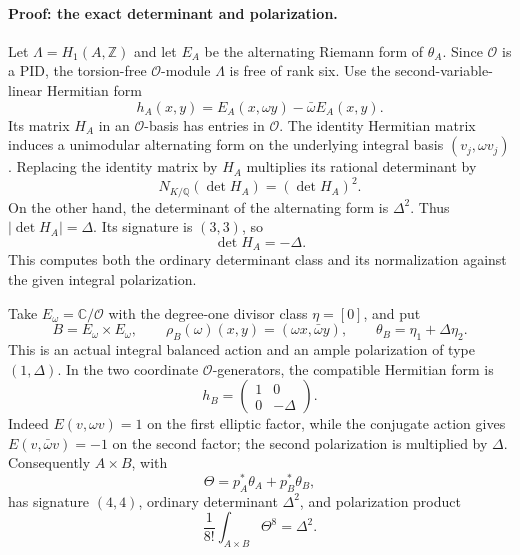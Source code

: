 \paragraph{Proof: the exact determinant and polarization.}
Let $\Lambda=H_1(A,\mathbb Z)$ and let $E_A$ be the alternating
Riemann form of $\theta_A$. Since $\mathcal O$ is a PID, the
torsion-free $\mathcal O$-module $\Lambda$ is free of rank six.
Use the second-variable-linear Hermitian form
\[
h_A(x,y)=E_A(x,\omega y)-\bar\omega E_A(x,y).
\]
Its matrix $H_A$ in an $\mathcal O$-basis has entries in $\mathcal O$.
The identity Hermitian matrix induces a unimodular alternating form
on the underlying integral basis $(v_j,\omega v_j)$. Replacing the
identity matrix by $H_A$ multiplies its rational determinant by
\[
N_{K/\mathbb Q}(\det H_A)=(\det H_A)^2.
\]
On the other hand, the determinant of the alternating form is
$\Delta^2$. Thus $|\det H_A|=\Delta$. Its signature is $(3,3)$,
so
\[
\det H_A=-\Delta.
\tag{G10.1}
\]
This computes both the ordinary determinant class and its normalization
against the given integral polarization.

Take $E_\omega=\mathbb C/\mathcal O$ with the degree-one divisor
class $\eta=[0]$, and put
\[
B=E_\omega\times E_\omega,\qquad
\rho_B(\omega)(x,y)=(\omega x,\bar\omega y),\qquad
\theta_B=\eta_1+\Delta\eta_2.
\]
This is an actual integral balanced action and an ample polarization
of type $(1,\Delta)$. In the two coordinate $\mathcal O$-generators,
the compatible Hermitian form is
\[
h_B=\begin{pmatrix}1&0\\0&-\Delta\end{pmatrix}.
\tag{G10.2}
\]
Indeed $E(v,\omega v)=1$ on the first elliptic factor, while the
conjugate action gives $E(v,\bar\omega v)=-1$ on the second factor;
the second polarization is multiplied by $\Delta$.
Consequently $A\times B$, with
\[
\Theta=p_A^*\theta_A+p_B^*\theta_B,
\]
has signature $(4,4)$, ordinary determinant $\Delta^2$, and
polarization product
\[
\frac1{8!}\int_{A\times B}\Theta^8=\Delta^2.
\tag{G10.3}
\]

